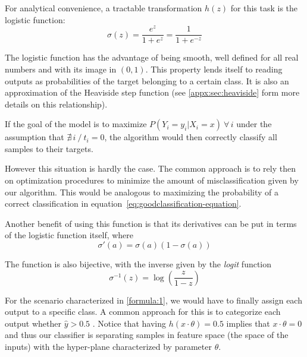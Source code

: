 For analytical convenience, a tractable transformation $h(z)$ for this task is the logistic function:
\begin{equation}
\sigma(z) = \frac{e^{z}}{1 + e^{z}} = \frac{1}{1 + e^{-z}}
\label{eq:logisticFunction}
\end{equation}

The logistic function has the advantage of being smooth, well defined for all real numbers and with its image in $(0,1)$.
This property lends itself to reading outputs as probabilities of the target belonging to a certain class.
It is also an approximation of the Heaviside step function (see \cref{appx:sec:heaviside} form more details on this relationship).


If the goal of the model is to maximize $P(Y_i = y_i | X_i = x) \ \forall \, i$
under the assumption that $\nexists\, i \ / \ t_i = 0$, the algorithm would then correctly classify all samples to their targets.

However this situation is hardly the case.
The common approach is to rely then on optimization procedures to minimize the amount of misclassification given by our algorithm.
This would be analogous to maximizing the probability of a correct classification in equation~\eqref{eq:goodclassification-equation}.


Another benefit of using this function is that its derivatives can be put in terms of the logistic function itself, where
\begin{equation}
\sigma '(a) = \sigma(a)( 1 - \sigma(a) )
\label{eq:derivativeLogisticFunction}
\end{equation}

The function is also bijective, with the inverse given by the \textit{logit} function
\begin{equation}
\sigma^{-1}(z) = \log \left( \frac{z}{1 - z} \right)
\label{eq:logitFunction}
\end{equation}

For the scenario characterized in \cref{formula:1}, we would have to finally assign each output to a specific class.
A common approach for this is to categorize each output whether $\hat{y} > 0.5$ \label{formula:logitThreshold}.
Notice that having $h(x \cdot \theta) = 0.5$ implies that $x \cdot \theta = 0$ and thus our classifier is separating samples in feature space (the space of the inputs) with the hyper-plane characterized by parameter $\theta$.

